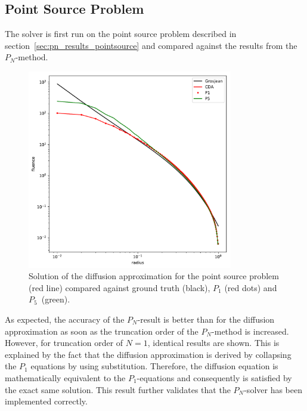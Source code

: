 \subsection{Point Source Problem}
\label{sec:da_results_pointsource}
The solver is first run on the point source problem described in section~\ref{sec:pn_results_pointsource} and compared against the results from the $P_N$-method.
\begin{figure}[h]
\centering
\includegraphics[width=0.8\textwidth]{05_diffusion_approximation/results/cda_result_plot_pointsource.pdf}
\caption{Solution of the diffusion approximation for the point source problem (red line) compared against ground truth (black), $P_1$ (red dots) and $P_5$~(green).}
\label{fig:da_results_pointsource_1}
\end{figure}

As expected, the accuracy of the $P_N$-result is better than for the diffusion approximation as soon as the truncation order of the $P_N$-method is increased. However, for truncation order of $N=1$, identical results are shown. This is explained by the fact that the diffusion approximation is derived by collapsing the $P_1$ equations by using substitution. Therefore, the diffusion equation is mathematically equivalent to the $P_1$-equations and consequently is satisfied by the exact same solution. This result further validates that the $P_N$-solver has been implemented correctly.


